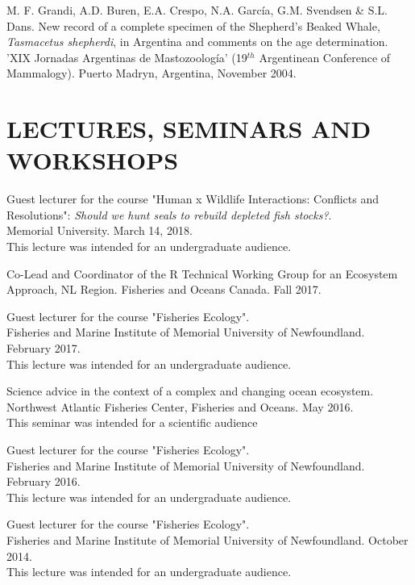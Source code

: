 \documentclass{res}
\begin{document}
\begin{resume}
\begin{hangparas}{.4in}{1}
M. F. Grandi, A.D. Buren, E.A. Crespo, N.A. García, G.M. Svendsen \& S.L. Dans. New record of a complete specimen of the Shepherd’s Beaked Whale, \textit{Tasmacetus shepherdi}, in Argentina and comments on the age determination. 'XIX Jornadas Argentinas de Mastozoolog\'{i}a' (19$^{th}$ Argentinean Conference of Mammalogy). Puerto Madryn, Argentina, November 2004.
	
	
\end{hangparas}	

\pagebreak
\section{LECTURES, SEMINARS AND WORKSHOPS}
\vspace{0.1in} 

Guest lecturer for the course "Human x Wildlife Interactions: Conflicts and Resolutions": \textit{Should we hunt seals to rebuild depleted fish stocks?}. \\ Memorial University. March 14, 2018. \\
This lecture was intended for an undergraduate audience.

Co-Lead and Coordinator of the R Technical Working Group for an Ecosystem Approach, NL Region. Fisheries and Oceans Canada. Fall 2017.

Guest lecturer for the course "Fisheries Ecology".\\ Fisheries and Marine Institute of Memorial University of Newfoundland. February 2017. \\
This lecture was intended for an undergraduate audience.

Science advice in the context of a complex and changing ocean ecosystem. Northwest Atlantic Fisheries Center, Fisheries and Oceans. May 2016. \\
This seminar was intended for a scientific audience 


Guest lecturer for the course "Fisheries Ecology". \\Fisheries and Marine Institute of Memorial University of Newfoundland. February 2016. \\
This lecture was intended for an undergraduate audience.

Guest lecturer for the course "Fisheries Ecology". \\Fisheries and Marine Institute of Memorial University of Newfoundland. October 2014. \\
This lecture was intended for an undergraduate audience.


\end{resume}
\end{document}
